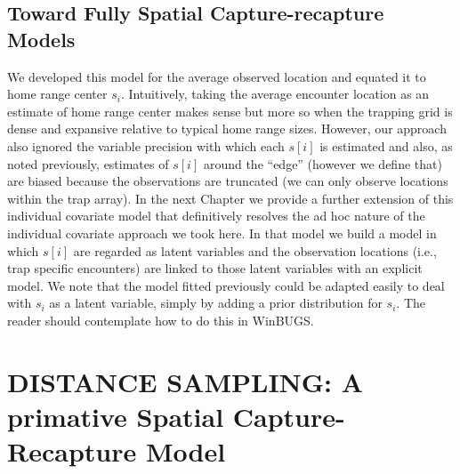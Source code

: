 \subsection{Toward Fully Spatial Capture-recapture Models}
We developed this model for the average observed location and equated it to home range center $s_{i}$. Intuitively, taking the average encounter location as an estimate of home range center makes sense but more so when the trapping grid is dense and expansive relative to typical home range sizes.  However, our approach also ignored  the variable precision with which each $s[i]$ is estimated and also, as noted previously, estimates of $s[i]$ around the ``edge'' (however we define that) are biased because the observations are truncated (we can only observe locations within the trap array).  In the next Chapter we provide a further extension of this individual covariate model that definitively resolves the ad hoc nature of the individual covariate approach we took here. In that model we build a model in which $s[i]$ are regarded as latent variables and the observation locations (i.e., trap specific encounters) are linked to those latent variables with an explicit model. We note that the model fitted previously could be adapted easily to deal with $s_{i}$ as a latent variable, simply by adding a prior distribution for $s_{i}$. The reader should contemplate how to do this in WinBUGS.


\section{DISTANCE SAMPLING: A primative Spatial Capture-Recapture Model}

